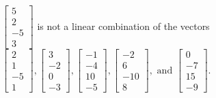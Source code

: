 \begin{exercise}
\begin{exerciseStatement}
  \end{exerciseStatement}
  \begin{exerciseAnswer}
   \(\left[\begin{array}{c}
5 \\
2 \\
-5 \\
3
\end{array}\right]\) 
  	 is not  
	a linear combination of the vectors \(\left[\begin{array}{c}
2 \\
1 \\
-5 \\
1
\end{array}\right] , \left[\begin{array}{c}
3 \\
-2 \\
0 \\
-3
\end{array}\right] , \left[\begin{array}{c}
-1 \\
-4 \\
10 \\
-5
\end{array}\right] , \left[\begin{array}{c}
-2 \\
6 \\
-10 \\
8
\end{array}\right] , \text{ and } \left[\begin{array}{c}
0 \\
-7 \\
15 \\
-9
\end{array}\right]\).

	
  


  \end{exerciseAnswer}
\end{exercise}